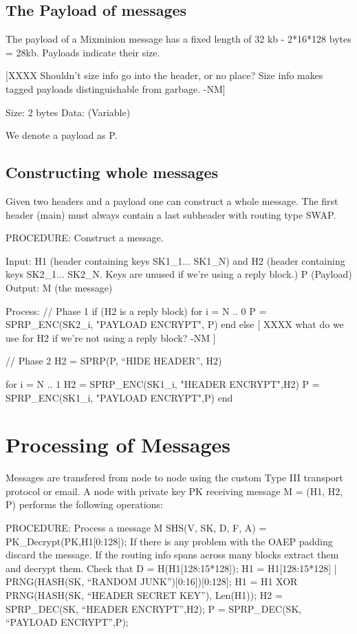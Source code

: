 \subsection{The Payload of messages}

The payload of a Mixminion message has a fixed length of 32 kb
- 2*16*128 bytes = 28kb.   Payloads indicate their size.

  [XXXX Shouldn't size info go into the header, or no place?  Size
     info makes tagged payloads distinguishable from garbage. -NM]

Size:   2 bytes
Data:   (Variable)

We denote a payload as P.

\subsection{Constructing whole messages}

Given two headers and a payload one can construct a whole
message. The first header (main) must always contain a last subheader
with routing type SWAP.  

PROCEDURE: Construct a message.

Input: H1 (header containing keys SK1_1... SK1_N)
       and H2 (header containing keys SK2_1... SK2_N.  Keys are unused
            if we're using a reply block.)
       P (Payload)
Output: M (the message)

Process:
	// Phase 1
	if (H2 is a reply block)
		for i = N .. 0
	            P = SPRP_ENC(SK2_i, "PAYLOAD ENCRYPT", P)
		end
        else
           [ XXXX what do we use for H2 if we're not using a reply
	           block? -NM ]

	// Phase 2
	H2 = SPRP(P, ``HIDE HEADER'', H2)

	for i = N .. 1
		H2 = SPRP_ENC(SK1_i, "HEADER ENCRYPT",H2)
		P = SPRP_ENC(SK1_i, "PAYLOAD ENCRYPT",P)
	end

\section{Processing of Messages}

Messages are transfered from node to node using the custom Type III
transport protocol or email.  A node with private key PK receiving
message M = (H1, H2, P) performs the following operations:

PROCEDURE: Process a message M
	SHS(V, SK, D, F, A) = PK_Decrypt(PK,H1[0:128]);
	If there is any problem with the OAEP padding discard the message.
	If the routing info spans across many blocks extract them and
		decrypt them.
	Check that D = H(H1[128:15*128]);
	H1 = H1[128:15*128] | PRNG(HASH(SK, ``RANDOM
						JUNK'')[0:16])[0:128];
	H1 = H1 XOR PRNG(HASH(SK, ``HEADER SECRET KEY''), Len(H1));
	H2 = SPRP_DEC(SK, ``HEADER ENCRYPT'',H2);
	P = SPRP_DEC(SK, ``PAYLOAD ENCRYPT'',P);

